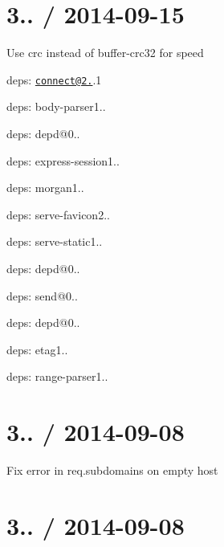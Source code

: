 \section*{3.. / 2014-\/09-\/15 }


\begin{DoxyItemize}
\item Use {\ttfamily crc} instead of {\ttfamily buffer-\/crc32} for speed
\item deps\+: \href{mailto:connect@2.26}{\tt connect@2.}.1
\begin{DoxyItemize}
\item deps\+: body-\/parser1..
\item deps\+: depd@0..
\item deps\+: express-\/session1..
\item deps\+: morgan1..
\item deps\+: serve-\/favicon2..
\item deps\+: serve-\/static1..
\end{DoxyItemize}
\item deps\+: depd@0..
\item deps\+: send@0..
\begin{DoxyItemize}
\item deps\+: depd@0..
\item deps\+: etag1..
\item deps\+: range-\/parser1..
\end{DoxyItemize}
\end{DoxyItemize}

\section*{3.. / 2014-\/09-\/08 }


\begin{DoxyItemize}
\item Fix error in {\ttfamily req.\+subdomains} on empty host
\end{DoxyItemize}

\section*{3.. / 2014-\/09-\/08 }


